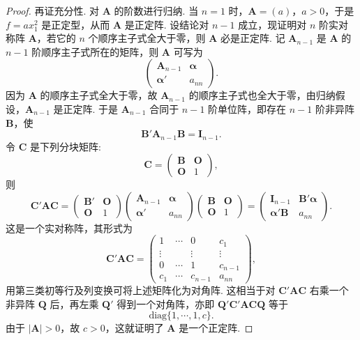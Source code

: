 \documentclass[../../main.tex]{subfiles}
\begin{document}
\begin{proof}
再证充分性. 对 $\boldsymbol{A}$ 的阶数进行归纳. 当 $n = 1$ 时，$\boldsymbol{A}=(a)$，$a>0$，于是 $f = ax_1^2$ 是正定型，从而 $\boldsymbol{A}$ 是正定阵. 设结论对 $n - 1$ 成立，现证明对 $n$ 阶实对称阵 $\boldsymbol{A}$，若它的 $n$ 个顺序主子式全大于零，则 $\boldsymbol{A}$ 必是正定阵. 记 $\boldsymbol{A}_{n - 1}$ 是 $\boldsymbol{A}$ 的 $n - 1$ 阶顺序主子式所在的矩阵，则 $\boldsymbol{A}$ 可写为
\[
\begin{pmatrix}
\boldsymbol{A}_{n - 1} & \boldsymbol{\alpha}\\
\boldsymbol{\alpha}' & a_{nn}
\end{pmatrix}.
\]
因为 $\boldsymbol{A}$ 的顺序主子式全大于零，故 $\boldsymbol{A}_{n - 1}$ 的顺序主子式也全大于零，由归纳假设，$\boldsymbol{A}_{n - 1}$ 是正定阵. 于是 $\boldsymbol{A}_{n - 1}$ 合同于 $n - 1$ 阶单位阵，即存在 $n - 1$ 阶非异阵 $\boldsymbol{B}$，使
\[
\boldsymbol{B}'\boldsymbol{A}_{n - 1}\boldsymbol{B}=\boldsymbol{I}_{n - 1}.
\]
令 $\boldsymbol{C}$ 是下列分块矩阵:
\[
\boldsymbol{C}=\begin{pmatrix}
\boldsymbol{B} & \boldsymbol{O}\\
\boldsymbol{O} & 1
\end{pmatrix},
\]
则
\[
\boldsymbol{C}'\boldsymbol{A}\boldsymbol{C}=\begin{pmatrix}
\boldsymbol{B}' & \boldsymbol{O}\\
\boldsymbol{O} & 1
\end{pmatrix}
\begin{pmatrix}
\boldsymbol{A}_{n - 1} & \boldsymbol{\alpha}\\
\boldsymbol{\alpha}' & a_{nn}
\end{pmatrix}
\begin{pmatrix}
\boldsymbol{B} & \boldsymbol{O}\\
\boldsymbol{O} & 1
\end{pmatrix}=
\begin{pmatrix}
\boldsymbol{I}_{n - 1} & \boldsymbol{B}'\boldsymbol{\alpha}\\
\boldsymbol{\alpha}'\boldsymbol{B} & a_{nn}
\end{pmatrix}.
\]
这是一个实对称阵，其形式为
\[
\boldsymbol{C}'\boldsymbol{A}\boldsymbol{C}=\begin{pmatrix}
1 & \cdots & 0 & c_1\\
\vdots & & \vdots & \vdots\\
0 & \cdots & 1 & c_{n - 1}\\
c_1 & \cdots & c_{n - 1} & a_{nn}
\end{pmatrix},
\]
用第三类初等行及列变换可将上述矩阵化为对角阵. 这相当于对 $\boldsymbol{C}'\boldsymbol{A}\boldsymbol{C}$ 右乘一个非异阵 $\boldsymbol{Q}$ 后，再左乘 $\boldsymbol{Q}'$ 得到一个对角阵，亦即 $\boldsymbol{Q}'\boldsymbol{C}'\boldsymbol{A}\boldsymbol{C}\boldsymbol{Q}$ 等于
\[
\mathrm{diag}\{1,\cdots,1,c\}.
\]
由于 $|\boldsymbol{A}|>0$，故 $c>0$，这就证明了 $\boldsymbol{A}$ 是一个正定阵. 

\end{proof}
\end{document}
